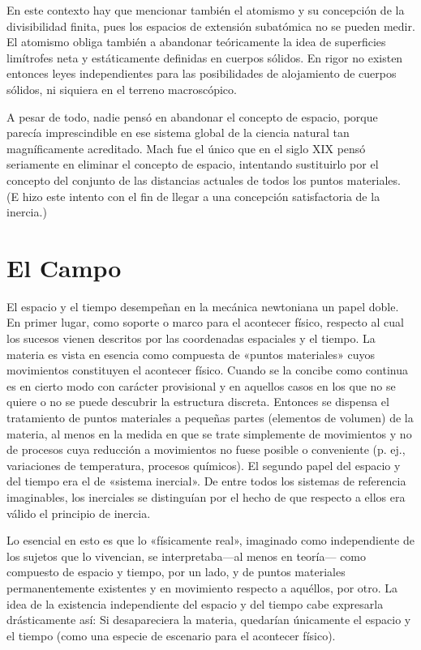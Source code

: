 \documentclass[spanish]{book}
\begin{document}
En este contexto hay que mencionar también el atomismo y su concepción de la
divisibilidad finita, pues los espacios de extensión subatómica no se pueden medir.
El atomismo obliga también a abandonar teóricamente la idea de superficies limítrofes
neta y estáticamente definidas en cuerpos sólidos. En rigor no existen entonces leyes
independientes para las posibilidades de alojamiento de cuerpos sólidos, ni siquiera en
el terreno macroscópico.

A pesar de todo, nadie pensó en abandonar el concepto de espacio, porque parecía
imprescindible en ese sistema global de la ciencia natural tan magníficamente
acreditado. Mach fue el único que en el siglo XIX pensó seriamente en eliminar el
concepto de espacio, intentando sustituirlo por el concepto del conjunto de las
distancias actuales de todos los puntos materiales. (E hizo este intento con el fin de
llegar a una concepción satisfactoria de la inercia.)

\section{El Campo}

El espacio y el tiempo desempeñan en la mecánica newtoniana un papel
doble. En primer lugar, como soporte o marco para el acontecer físico, respecto al
cual los sucesos vienen descritos por las coordenadas espaciales y el tiempo. La materia
es vista en esencia como compuesta de «puntos materiales» cuyos movimientos
constituyen el acontecer físico. Cuando se la concibe como continua es en cierto
modo con carácter provisional y en aquellos casos en los que no se quiere o no se
puede descubrir la estructura discreta. Entonces se dispensa el tratamiento de puntos
materiales a pequeñas partes (elementos de volumen) de la materia, al menos en la
medida en que se trate simplemente de movimientos y no de procesos cuya reducción
a movimientos no fuese posible o conveniente (p. ej., variaciones de temperatura,
procesos químicos). El segundo papel del espacio y del tiempo era el de «sistema
inercial». De entre todos los sistemas de referencia imaginables, los inerciales se
distinguían por el hecho de que respecto a ellos era válido el principio de inercia.

Lo esencial en esto es que lo «físicamente real», imaginado como independiente de
los sujetos que lo vivencian, se interpretaba—al menos en teoría— como compuesto de
espacio y tiempo, por un lado, y de puntos materiales permanentemente existentes y
en movimiento respecto a aquéllos, por otro. La idea de la existencia independiente del
espacio y del tiempo cabe expresarla drásticamente así: Si desapareciera la materia,
quedarían únicamente el espacio y el tiempo (como una especie de escenario para el
acontecer físico).
\end{document}
